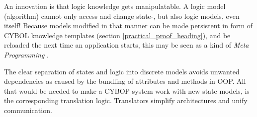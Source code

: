 An innovation is that logic knowledge gets manipulatable. A logic model
(algorithm) cannot only access and change state-, but also logic models, even
itself! Because models modified in that manner can be made persistent in form
of CYBOL knowledge templates (section \ref{practical_proof_heading}), and be
reloaded the next time an application starts, this may be seen as a kind of
\emph{Meta Programming} \cite{wikipedia}.

The clear separation of states and logic into discrete models avoids unwanted
dependencies as caused by the bundling of attributes and methods in OOP. All
that would be needed to make a CYBOP system work with new state models, is the
corresponding translation logic. Translators \cite{hellerkunze} simplify
architectures and unify communication.
